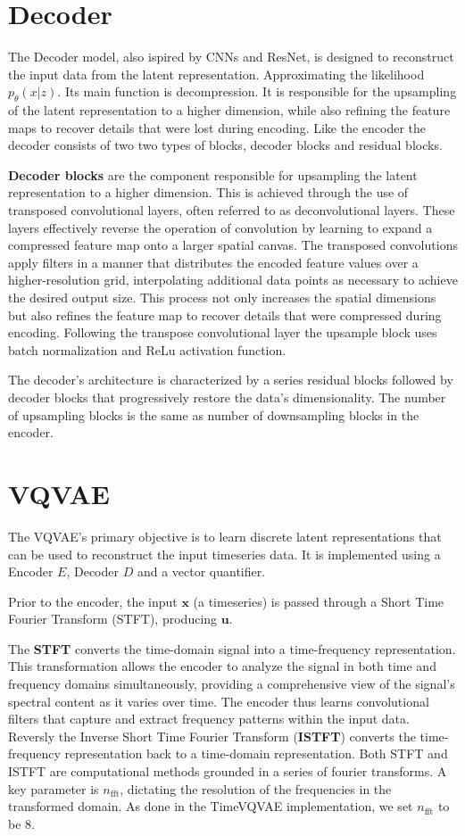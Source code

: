 \section{Decoder}
The Decoder model, also ispired by CNNs and ResNet, is designed to reconstruct the input data from the latent representation. Approximating the likelihood $p_\theta(x|z)$.
Its main function is decompression. It is responsible for the upsampling of the latent representation to a higher dimension, while also refining the feature maps to recover details that were lost during encoding.
Like the encoder the decoder consists of two two types of blocks, decoder blocks and residual blocks.


\textbf{Decoder blocks} are the component responsible for upsampling the latent representation to a higher dimension. This is achieved through the use of transposed convolutional layers, often referred to as deconvolutional layers. These layers effectively reverse the operation of convolution by learning to expand a compressed feature map onto a larger spatial canvas.
The transposed convolutions apply filters in a manner that distributes the encoded feature values over a higher-resolution grid, interpolating additional data points as necessary to achieve the desired output size.
This process not only increases the spatial dimensions but also refines the feature map to recover details that were compressed during encoding.
Following the transpose convolutional layer the upsample block uses batch normalization and ReLu activation function.

The decoder's architecture is characterized by a series residual blocks followed by decoder blocks that progressively restore the data's dimensionality. The number of upsampling blocks is the same as number of downsampling blocks in the encoder. 


\section{VQVAE}
The VQVAE's primary objective is to learn discrete latent representations that can be used to reconstruct the input timeseries data. It is implemented using a Encoder $E$, Decoder $D$ and a vector quantifier.

Prior to the encoder, the input $\mathbf{x}$ (a timeseries) is passed through a Short Time Fourier Transform (STFT), producing $\mathbf{u}$. 

The \textbf{STFT} converts the time-domain signal into a time-frequency representation. This transformation allows the encoder to analyze the signal in both time and frequency domains simultaneously, providing a comprehensive view of the signal's spectral content as it varies over time. 
The encoder thus learns convolutional filters that capture and extract frequency patterns within the input data.
Reversly the Inverse Short Time Fourier Transform (\textbf{ISTFT}) converts the time-frequency representation back to a time-domain representation. 
Both STFT and ISTFT are computational methods grounded in a series of fourier transforms. A key parameter is $n_{\text{fft}}$, dictating the resolution of the frequencies in the transformed domain.
As done in the TimeVQVAE implementation, we set $n_{\text{fft}}$ to be 8.

